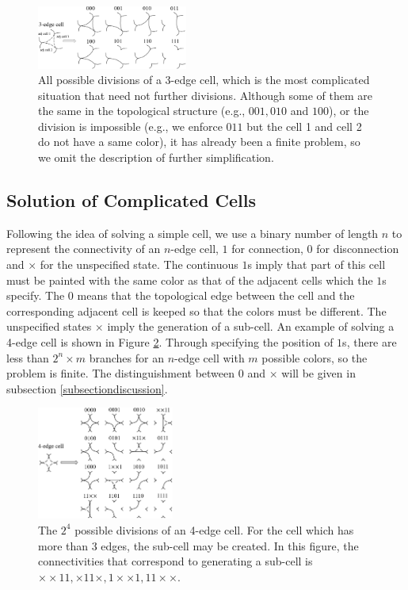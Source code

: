 \documentclass[journal]{IEEEtran}
\begin{document}
\begin{figure}[t]
\centering
\includegraphics[width = 0.44\textwidth]{easycell/cell3}
\caption{All possible divisions of a 3-edge cell, which is the most complicated situation that need not further divisions. Although some of them are the same in the topological structure (e.g., $001, 010$ and $100$), or the division is impossible (e.g., we enforce $011$ but the cell 1 and cell 2 do not have a same color), it has already been a finite problem, so we omit the description of further simplification. }\label{figeasycell3}
\end{figure}


\subsection{Solution of Complicated Cells}

Following the idea of solving a simple cell, we use a binary number of length $n$ to represent the connectivity of an $n$-edge cell, $1$ for connection, $0$ for disconnection and $\times$ for the unspecified state. 
The continuous $1$s imply that part of this cell must be painted with the same color as that of the adjacent cells which the $1$s specify. 
The $0$ means that the topological edge between the cell and the corresponding adjacent cell is keeped so that the colors must be different. 
The unspecified states $\times$ imply the generation of a sub-cell. An example of solving a 4-edge cell is shown in Figure \ref{figeasycell4}. Through specifying the position of $1$s, there are less than $2^n\times m$ branches for an $n$-edge cell with $m$ possible colors, so the problem is finite. The distinguishment between $0$ and $\times$ will be given in subsection \ref{subsectiondiscussion}.

\begin{figure}[t]
\centering
\includegraphics[width = 0.4\textwidth]{easycell/cell4}
\caption{The $2^4$ possible divisions of an 4-edge cell. For the cell which has more than 3 edges, the sub-cell may be created. In this figure, the connectivities that correspond to generating a sub-cell is $\times\times11, \times11\times, 1\times\times1, 11\times\times$. }\label{figeasycell4}
\end{figure}
\end{document}
